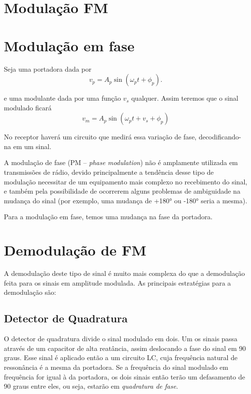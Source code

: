 \documentclass[]{report}
\begin{document}
\section{Modulação FM}
\section{Modulação em fase}

Seja uma portadora dada por
\begin{equation}\label{portadora_PM}
v_p = A_p \sin(\omega_p t + \phi_p).
\end{equation}

e uma modulante dada por uma função $v_s$ qualquer. Assim teremos que o sinal modulado ficará
\begin{equation}\label{modulada_PM}
v_m = A_p \sin(\omega_p t + v_s + \phi_p)
\end{equation}

No receptor haverá um circuito que medirá essa variação de fase, decodificando-na em um sinal.

A modulação de fase (PM – \textit{phase modulation}) não é amplamente utilizada em transmissões de rádio, devido principalmente a tendência desse tipo de modulação necessitar de um equipamento mais complexo no recebimento do sinal, e também pela possibilidade de ocorrerem alguns problemas de ambiguidade na mudança do sinal (por exemplo, uma mudança de +180° ou -180° seria a mesma).

Para a modulação em fase, temos uma mudança na fase da portadora.

\section{Demodulação de FM}
A demodulação deste tipo de sinal é muito mais complexa do que a demodulação feita para os sinais em amplitude modulada. As principais estratégias para a demodulação são:
\subsection{Detector de Quadratura}
O detector de quadratura divide o sinal modulado em dois. Um os sinais passa através de um capacitor de alta reatância, assim deslocando a fase do sinal em 90 graus. Esse sinal é aplicado então a um circuito LC, cuja frequência natural de ressonância é a mesma da portadora. Se a frequência do sinal modulado em frequência for igual à da portadora, os dois sinais então terão um defasamento de 90 graus entre eles, ou seja, estarão em \textit{quadratura de fase}.
\end{document}
